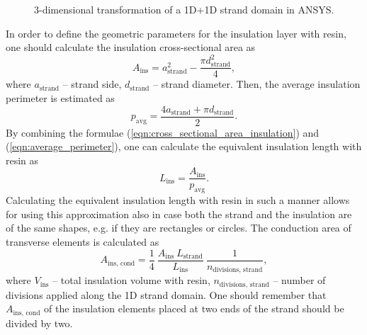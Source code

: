 \begin{figure}[H]
    \caption{3-dimensional transformation of a 1D+1D strand domain in ANSYS.}
    \label{fig: 1d_strand_geometry_with_insulation}
\end{figure}

In order to define the geometric parameters for the insulation layer with resin, one should calculate the insulation cross-sectional area as
\begin{equation}
    A_\text{ins} = a_\text{strand}^2 - \frac{\pi d_\text{strand}^2}{4}, 
    \label{eqn:cross_sectional_area_insulation}
\end{equation}
where $a_\text{strand}$ -- strand side, $d_\text{strand}$ -- strand diameter. Then, the average insulation perimeter is estimated as
\begin{equation}
    p_\text{avg} = \frac{4 a_\text{strand} + \pi d_\text{strand}}{2}.
    \label{eqn:average_perimeter}
\end{equation}
By combining the formulae (\ref{eqn:cross_sectional_area_insulation}) and (\ref{eqn:average_perimeter}), one can calculate the equivalent insulation length with resin as 
\begin{equation}
    L_\text{ins} = \frac{A_\text{ins}}{p_\text{avg}}.
    \label{eqn:equivalent_insulation_length}
\end{equation}
Calculating the equivalent insulation length with resin in such a manner allows for using this approximation also in case both the strand and the insulation are of the same shapes, e.g. if they are rectangles or circles. The conduction area of transverse elements is calculated as
\begin{equation}
    A_\text{ins, cond} = \frac{1}{4}~\frac{ A_\text{ins} ~ L_\text{strand} }{L_\text{ins}}~\frac{1}{n_\text{divisions, strand}},
    \label{eqn:equivalent_insulation_element_area}
\end{equation}
where $V_\text{ins}$ -- total insulation volume with resin, $n_\text{divisions, strand}$ -- number of divisions applied along the 1D strand domain. One should remember that $A_\text{ins, cond}$ of the insulation elements placed at two ends of the strand should be divided by two.~\cite{matthias_communication}

